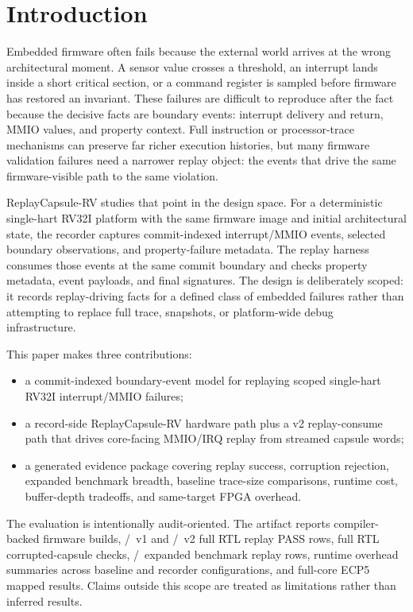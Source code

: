 \section{Introduction}

Embedded firmware often fails because the external world arrives at the wrong architectural moment. A sensor value crosses a threshold, an interrupt lands inside a short critical section, or a command register is sampled before firmware has restored an invariant. These failures are difficult to reproduce after the fact because the decisive facts are boundary events: interrupt delivery and return, MMIO values, and property context. Full instruction or processor-trace mechanisms can preserve far richer execution histories, but many firmware validation failures need a narrower replay object: the events that drive the same firmware-visible path to the same violation.

ReplayCapsule-RV studies that point in the design space. For a deterministic single-hart RV32I platform with the same firmware image and initial architectural state, the recorder captures commit-indexed interrupt/MMIO events, selected boundary observations, and property-failure metadata. The replay harness consumes those events at the same commit boundary and checks property metadata, event payloads, and final signatures. The design is deliberately scoped: it records replay-driving facts for a defined class of embedded failures rather than attempting to replace full trace, snapshots, or platform-wide debug infrastructure.

This paper makes three contributions:
\begin{itemize}
  \item a commit-indexed boundary-event model for replaying scoped single-hart RV32I interrupt/MMIO failures;
  \item a record-side ReplayCapsule-RV hardware path plus a v2 replay-consume path that drives core-facing MMIO/IRQ replay from streamed capsule words;
  \item a generated evidence package covering replay success, corruption rejection, expanded benchmark breadth, baseline trace-size comparisons, runtime cost, buffer-depth tradeoffs, and same-target FPGA overhead.
\end{itemize}

The evaluation is intentionally audit-oriented. The artifact reports compiler-backed firmware builds, \rcFullReplayPass/\rcFullReplayTotal\ v1 and \rcVTwoReplayPass/\rcVTwoReplayTotal\ v2 full RTL replay PASS rows, full RTL corrupted-capsule checks, \rcExpandedReplayPass/\rcExpandedReplayTotal\ expanded benchmark replay rows, runtime overhead summaries across baseline and recorder configurations, and full-core ECP5 mapped results. Claims outside this scope are treated as limitations rather than inferred results.

